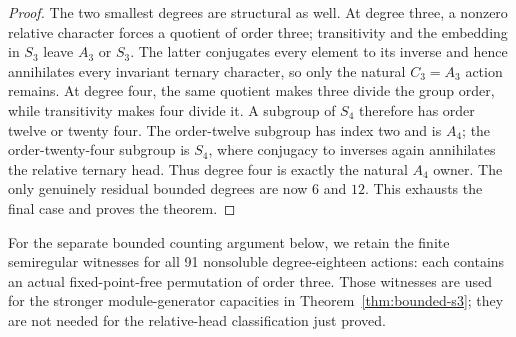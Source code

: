 \begin{proof}
The two smallest degrees are structural as well.  At degree three, a
nonzero relative character forces a quotient of order three; transitivity
and the embedding in $S_3$ leave $A_3$ or $S_3$.  The latter conjugates
every element to its inverse and hence annihilates every invariant ternary
character, so only the natural $C_3=A_3$ action remains.  At degree four,
the same quotient makes three divide the group order, while transitivity
makes four divide it.  A subgroup of $S_4$ therefore has order twelve or
twenty four.  The order-twelve subgroup has index two and is $A_4$; the
order-twenty-four subgroup is $S_4$, where conjugacy to inverses again
annihilates the relative ternary head.  Thus degree four is exactly the
natural $A_4$ owner.  The only genuinely residual bounded degrees are now
$6$ and $12$.  This exhausts the final case and proves the theorem.
\end{proof}

For the separate bounded counting argument below, we retain the finite
semiregular witnesses for all 91 nonsoluble degree-eighteen actions:
each contains an actual fixed-point-free permutation of order three.
Those witnesses are used for the stronger module-generator capacities
in Theorem~\ref{thm:bounded-s3}; they are not needed for the relative-head
classification just proved.
